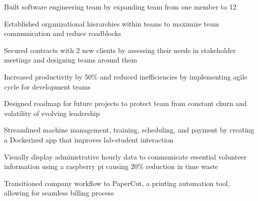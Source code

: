 \documentclass[]{jack-resume}
\begin{document}
\begin{tightemize}
\item Built software engineering team by expanding team from one member to 12
\item Established organizational hierarchies within teams to maximize team communication and reduce roadblocks
\item Secured contracts with 2 new clients by assessing their needs in stakeholder meetings and designing teams around them
\item Increased productivity by 50\% and reduced inefficiencies by implementing agile cycle for development teams
\item Designed roadmap for future projects to protect team from constant churn and volatility of evolving leadership
\end{tightemize}
\begin{tightemize}
\item Streamlined machine management, training, scheduling, and payment by creating a Dockerized app that improves lab-student interaction
\item Visually display administrative hourly data to communicate essential volunteer information using a raspberry pi causing 20\% reduction in time waste 
\item Transitioned company workflow to PaperCut, a printing automation tool, allowing for seamless billing process
\end{tightemize}
\sectionsep


\end{document}
